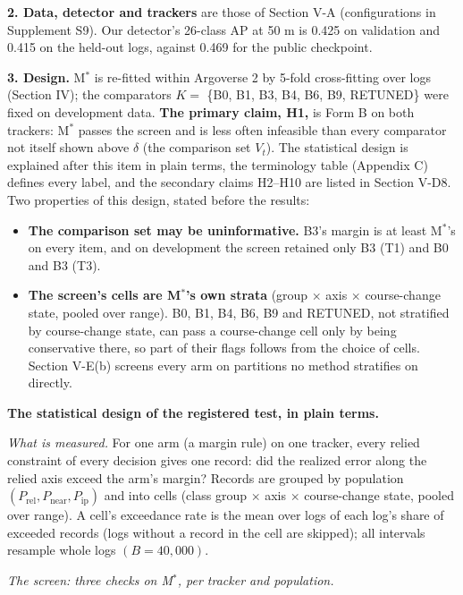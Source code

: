 \documentclass{ieeeaccess}
\begin{document}
\textbf{2. Data, detector and trackers} are those of Section V-A (configurations in Supplement S9). Our detector's 26-class AP at 50 m is 0.425 on validation and 0.415 on the held-out logs, against 0.469 for the public checkpoint.

\textbf{3. Design.} M$^{*}$ is re-fitted within Argoverse 2 by 5-fold cross-fitting over logs (Section IV); the comparators $K =$ \{B0, B1, B3, B4, B6, B9, RETUNED\} were fixed on development data. \textbf{The primary claim, H1,} is Form B on both trackers: M$^{*}$ passes the screen and is less often infeasible than every comparator not itself shown above $\delta$ (the comparison set $V_{t}$). The statistical design is explained after this item in plain terms, the terminology table (Appendix C) defines every label, and the secondary claims H2--H10 are listed in Section V-D8. Two properties of this design, stated before the results:

\begin{itemize}
\item \textbf{The comparison set may be uninformative.} B3's margin is at least M$^{*}$'s on every item, and on development the screen retained only B3 (T1) and B0 and B3 (T3).
\item \textbf{The screen's cells are M$^{*}$'s own strata} (group $\times$ axis $\times$ course-change state, pooled over range). B0, B1, B4, B6, B9 and RETUNED, not stratified by course-change state, can pass a course-change cell only by being conservative there, so part of their flags follows from the choice of cells. Section V-E(b) screens every arm on partitions no method stratifies on directly.
\end{itemize}

\textbf{The statistical design of the registered test, in plain terms.}

\emph{What is measured.} For one arm (a margin rule) on one tracker, every relied constraint of every decision gives one record: did the realized error along the relied axis exceed the arm's margin? Records are grouped by population $(P_{\mathrm{rel}}, P_{\mathrm{near}}, P_{\mathrm{ip}})$ and into cells (class group $\times$ axis $\times$ course-change state, pooled over range). A cell's exceedance rate is the mean over logs of each log's share of exceeded records (logs without a record in the cell are skipped); all intervals resample whole logs $(B = 40{,}000)$.

\emph{The screen: three checks on M$^{*}$, per tracker and population.}
\end{document}

